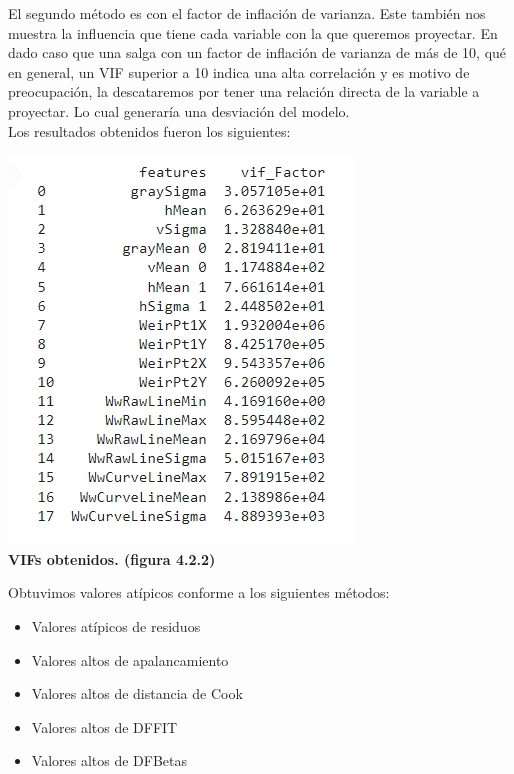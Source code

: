 \documentclass{article}
\begin{document}
        El segundo método es con el factor de inflación de varianza. Este también nos muestra la influencia que tiene cada variable con la que queremos proyectar. En dado caso que una salga con un factor de inflación de varianza de más de 10, qué en general, un VIF superior a 10 indica una alta correlación y es motivo de preocupación, la descataremos por tener una relación directa de la variable a proyectar. Lo cual generaría una desviación del modelo.\\
        
        Los resultados obtenidos fueron los siguientes:\\
        
        \begin{center}
                \includegraphics[scale=0.7]{images/stage-variance-inflation.PNG} \\
                \textbf{VIFs obtenidos. (figura 4.2.2)}
        \end{center}
        
        Obtuvimos valores atípicos conforme a los siguientes métodos:
        
                    \begin{itemize}
                        \item Valores atípicos de residuos
                        \item Valores altos de apalancamiento
                        \item Valores altos de distancia de Cook
                        \item Valores altos de DFFIT
                        \item  Valores altos de DFBetas 
                    \end{itemize}
           
\end{document}
